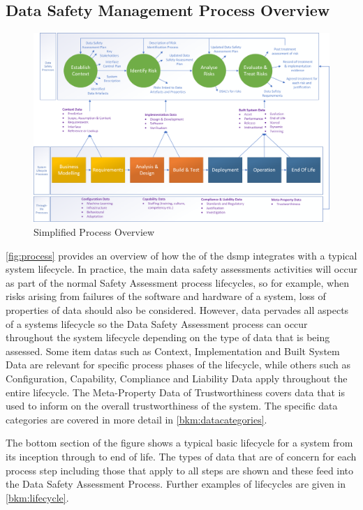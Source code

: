\subsection{Data Safety Management Process Overview}
\begin{figure}[hb]
\centering
\includegraphics[angle=90,scale=0.7]{images/process_diagram}
\caption{Simplified Process Overview}
\label{fig:process}
\end{figure}

\autoref{fig:process} provides an overview of how the of the \gls{dsmp}
integrates with a typical system lifecycle. In practice, the main data safety assessments activities will
occur as part of the normal Safety Assessment process lifecycles, so for example, when risks arising
from failures of the software and hardware of a system, loss of properties of data should also be
considered. However, data pervades all aspects of a systems lifecycle so the Data Safety Assessment
process can occur throughout the system lifecycle depending on the type of data that is being
assessed. Some \glspl{item data} such as Context, Implementation and Built System Data are relevant for
specific process phases of the lifecycle, while others such as Configuration, Capability, Compliance and
Liability Data apply throughout the entire lifecycle. The Meta-Property Data of Trustworthiness
covers data that is used to inform on the overall trustworthiness of the system. The specific data
categories are covered in more detail in \autoref{bkm:datacategories}.

The bottom section of the figure shows a typical basic lifecycle for a system from its inception
through to end of life. The types of data that are of concern for each process step including those
that apply to all steps are shown and these feed into the Data Safety Assessment Process. Further
examples of lifecycles are given in \autoref{bkm:lifecycle}.
\cbend

